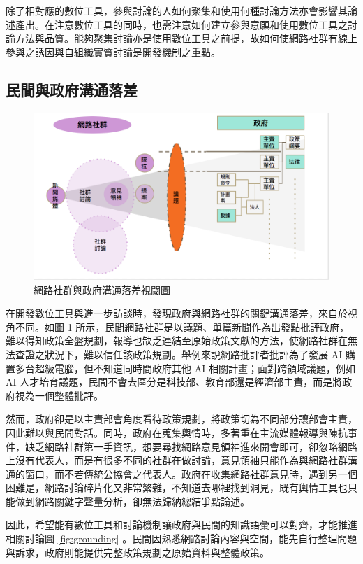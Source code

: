 \documentclass[12pt,a4paper]{article}
\begin{document}
\begin{enumerate}
除了相對應的數位工具，參與討論的人如何聚集和使用何種討論方法亦會影響其論述產出。在注意數位工具的同時，也需注意如何建立參與意願和使用數位工具之討論方法與品質。能夠聚集討論亦是使用數位工具之前提，故如何使網路社群有線上參與之誘因與自組織實質討論是開發機制之重點。
\end{enumerate}

\subsection{民間與政府溝通落差}
\label{sec:org7fc402d}
\begin{figure}[htbp]
\centering
\includegraphics[width=.9\linewidth]{./images/gap1.png}
\caption{\label{fig:gap1}
網路社群與政府溝通落差視閾圖}
\end{figure}

在開發數位工具與進一步訪談時，發現政府與網路社群的關鍵溝通落差，來自於視角不同。如圖 \ref{fig:gap1} 所示，民間網路社群是以議題、單篇新聞作為出發點批評政府，難以得知政策全盤規劃，報導也缺乏連結至原始政策文獻的方法，使網路社群在無法查證之狀況下，難以信任該政策規劃。舉例來說網路批評者批評為了發展 AI 購置多台超級電腦，但不知道同時間政府其他 AI 相關計畫；面對跨領域議題，例如 AI 人才培育議題，民間不會去區分是科技部、教育部還是經濟部主責，而是將政府視為一個整體批評。

然而，政府卻是以主責部會角度看待政策規劃，將政策切為不同部分讓部會主責，因此難以與民間對話。同時，政府在蒐集輿情時，多著重在主流媒體報導與陳抗事件，缺乏網路社群第一手資訊，想要尋找網路意見領袖進來開會即可，卻忽略網路上沒有代表人，而是有很多不同的社群在做討論，意見領袖只能作為與網路社群溝通的窗口，而不若傳統公協會之代表人。政府在收集網路社群意見時，遇到另一個困難是，網路討論碎片化又非常繁雜，不知道去哪裡找到洞見，既有輿情工具也只能做到網路關鍵字聲量分析，卻無法歸納總結爭點論述。

因此，希望能有數位工具和討論機制讓政府與民間的知識語彙可以對齊，才能推進相關討論圖 \ref{fig:grounding} 。民間因熟悉網路討論內容與空間，能先自行整理問題與訴求，政府則能提供完整政策規劃之原始資料與整體政策。
\end{document}
